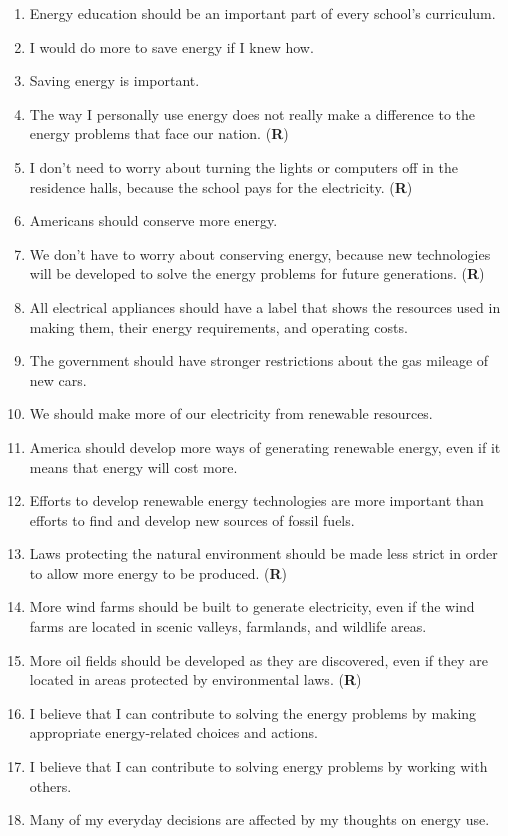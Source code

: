 \begin{enumerate}
	\item Energy education should be an important part of every school's curriculum.
	\item I would do more to save energy if I knew how.
	\item Saving energy is important.
	\item The way I personally use energy does not really make a difference to the energy problems that face our nation. (\textbf{R})
	\item I don't need to worry about turning the lights or computers off in the residence halls, because the school pays for the electricity. (\textbf{R})
	\item Americans should conserve more energy.
	\item We don't have to worry about conserving energy, because new technologies will be developed to solve the energy problems for future generations. (\textbf{R})
	\item All electrical appliances should have a label that shows the resources used in making them, their energy requirements, and operating costs.
	\item The government should have stronger restrictions about the gas mileage of new cars.
	\item We should make more of our electricity from renewable resources.
	\item America should develop more ways of generating renewable energy, even if it means that energy will cost more.
	\item Efforts to develop renewable energy technologies are more important than efforts to find and develop new sources of fossil fuels.
	\item Laws protecting the natural environment should be made less strict in order to allow more energy to be produced. (\textbf{R})
	\item More wind farms should be built to generate electricity, even if the wind farms are located in scenic valleys, farmlands, and wildlife areas.
	\item More oil fields should be developed as they are discovered, even if they are located in areas protected by environmental laws. (\textbf{R})
	\item I believe that I can contribute to solving the energy problems by making appropriate energy-related choices and actions.
	\item I believe that I can contribute to solving energy problems by working with others.
	\item Many of my everyday decisions are affected by my thoughts on energy use.
\end{enumerate}



